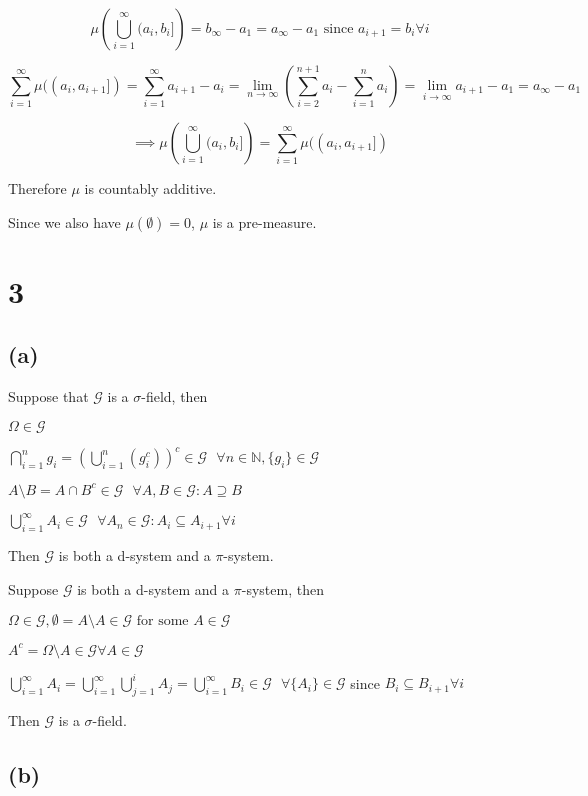 $$
\mu\left(
\bigcup_{i=1}^{\infty}
(a_i,b_i]
\right)
=
b_\infty-a_1
=
a_\infty-a_1
\text{ since } a_{i+1}=b_{i}\forall i
$$

$$
\sum_{i=1}^{\infty} \mu((a_i,a_{i+1}])=
\sum_{i=1}^{\infty} a_{i+1}-a_i=
\lim_{n\rightarrow\infty}(\sum_{i=2}^{n+1} a_{i} -\sum_{i=1}^{n}a_i)=
\lim_{i\rightarrow\infty} a_{i+1}-a_1=
a_\infty-a_1
$$

$$
\implies
\mu\left(
\bigcup_{i=1}^{\infty}
(a_i,b_i]
\right)
=\sum_{i=1}^{\infty} \mu((a_i,a_{i+1}])
$$

Therefore $\mu$ is countably additive.

Since we also have $\mu(\emptyset)=0$, $\mu$ is a pre-measure.


\bigskip
\section*{3}

\subsection*{(a)}

Suppose that $\mathcal{G}$ is a $\sigma$-field, then

$\Omega\in\mathcal{G}$

$\bigcap_{i=1}^n g_i=(\bigcup_{i=1}^n(g_i^c))^c\in\mathcal{G}\:\:\:\forall n\in\mathbb{N}, \{g_i\}\in\mathcal{G}$

$A\setminus B=A\cap B^c\in\mathcal{G}\:\:\: \forall A,B\in\mathcal{G}:A\supseteq B $

$\bigcup_{i=1}^{\infty}A_i\in\mathcal{G}\:\:\:\forall A_n\in\mathcal{G}:A_i\subseteq A_{i+1}\forall i$

Then $\mathcal{G}$ is both a d-system and a $\pi$-system.

\bigskip

Suppose $\mathcal{G}$ is both a d-system and a $\pi$-system, then

$\Omega\in\mathcal{G},\emptyset=A\setminus A\in\mathcal{G}\text{ for some } A\in\mathcal{G}$

$A^c=\Omega\setminus A\in\mathcal{G}\forall A \in\mathcal{G}$

$\bigcup_{i=1}^{\infty} A_i=\bigcup_{i=1}^{\infty}\bigcup_{j=1}^{i} A_j=\bigcup_{i=1}^{\infty}B_i\in\mathcal{G}\:\:\:\forall \{A_i\}\in\mathcal{G} $ since $B_i\subseteq B_{i+1}\forall i$

Then $\mathcal{G}$ is a $\sigma$-field.

\subsection*{(b)}

